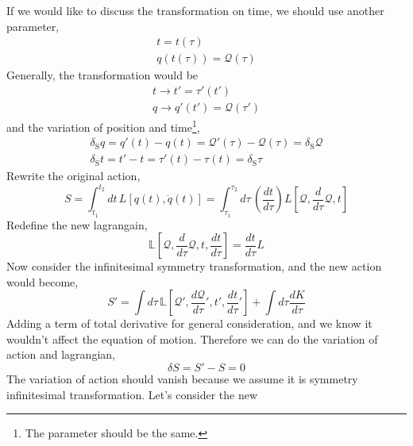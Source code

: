 \documentclass[12pt]{article}
\numberwithin{equation}{section}
\begin{document}
If we would like to discuss the transformation on time, we should use another parameter,
\begin{equation}
    \begin{split}
        t = t(\tau)\\
        q(t(\tau)) = \mathcal{Q}(\tau)
    \end{split}
\end{equation}
Generally, the transformation would be
\begin{equation}
    \begin{split}
        t\rightarrow t' = \tau'(t')\\
        q\rightarrow q'(t') = \mathcal{Q}(\tau')
    \end{split}
\end{equation}
and the variation of position and time\footnote{The parameter should be the same.},
\begin{equation}
    \begin{split}
        \delta_{\text{S}}q = q'(t)-q(t) =\mathcal{Q}'(\tau) - \mathcal{Q}(\tau)= \delta_{\text{S}}\mathcal{Q}\\
        \delta_{\text{S}}t = t'-t = \tau'(t) -\tau(t) = \delta_{\text{S}}\tau
    \end{split}
\end{equation}
Rewrite the original action,
\begin{equation}
    S = \int_{t_1}^{t_2}{dt\,L[q(t), \dot{q}(t)]} = \int_{\tau_1}^{\tau_2}{d\tau\,\left(\frac{dt}{d\tau}\right)L[\mathcal{Q}, \frac{d}{d\tau}\mathcal{Q}, t]}
\end{equation}
Redefine the new lagrangain,
\begin{equation}
    \mathbb{L}\left[\mathcal{Q}, \frac{d}{d\tau}\mathcal{Q},t,\frac{dt}{d\tau}\right] = \frac{dt}{d\tau}L
\end{equation}
Now consider the infinitesimal symmetry transformation, and the new action would become,
\begin{equation}
    S' = \int{d\tau\,\mathbb{L}\left[\mathcal{Q}', \frac{d\mathcal{Q}}{d\tau}', t',\frac{dt}{d\tau}'\right]} + \int{d\tau\frac{dK}{d\tau}}
\end{equation}
Adding a term of total derivative for general consideration, and we know it wouldn't affect the equation of motion.
Therefore we can do the variation of action and lagrangian,
\begin{equation}
    \delta S = S' - S = 0
\end{equation}
The variation of action should vanish because we assume it is symmetry infinitesimal transformation.
Let's consider the new
\end{document}
